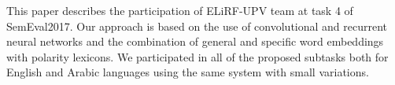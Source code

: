 This paper describes the participation of ELiRF-UPV team at task 4 of SemEval2017. Our approach is based on the use of convolutional and recurrent neural networks and the combination of general and specific word embeddings with polarity lexicons. We participated in all of the proposed subtasks both for English and Arabic languages using the same system with small variations.

